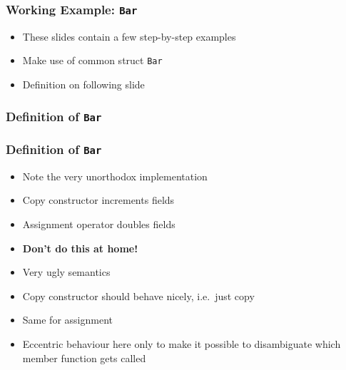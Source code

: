 \begin{frame}
  \frametitle{Working Example: {\tt Bar}}
  \begin{itemize}
    \item These slides contain a few step-by-step examples
    \item Make use of common struct {\tt Bar}
    \item Definition on following slide
  \end{itemize}
\end{frame}

\begin{frame}
  \frametitle{Definition of {\tt Bar}}
\end{frame}

\begin{frame}
  \frametitle{Definition of {\tt Bar}}
  \begin{itemize}
    \item Note the very unorthodox implementation
    \item Copy constructor increments fields
    \item Assignment operator doubles fields
    \item \textbf{Don't do this at home!}
    \item Very ugly semantics
    \item Copy constructor should behave nicely, i.e.~just copy
    \item Same for assignment
    \item Eccentric behaviour here only to make it possible to disambiguate which member function gets called
  \end{itemize}
\end{frame}

